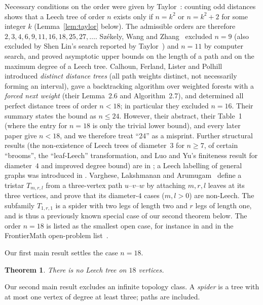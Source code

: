 \documentclass[11pt,a4paper]{article}
\theoremstyle{plain}
\newtheorem{theorem}{Theorem}[section]
\theoremstyle{remark}
\begin{document}
Necessary conditions on the order were given by Taylor~\cite{Taylor1977}:
counting odd distances shows that a Leech tree of order $n$ exists only if
$n=k^2$ or $n=k^2+2$ for some integer $k$ (Lemma~\ref{lem:taylor} below).  The
admissible orders are therefore $2,3,4,6,9,11,16,18,25,27,\dots$.  Sz\'ekely,
Wang and Zhang~\cite{SzekelyWangZhang2005} excluded $n=9$ (also excluded by Shen
Lin's search reported by Taylor~\cite{Taylor1991}) and $n=11$ by computer search,
and proved asymptotic upper bounds on the length of a path and on the maximum
degree of a Leech tree.  Calhoun, Ferland, Lister and Polhill~\cite{Calhoun2007}
introduced \emph{distinct distance trees} (all path weights distinct, not
necessarily forming an interval), gave a backtracking algorithm over weighted
forests with a \emph{forced next weight} (their Lemma~2.6 and Algorithm~2.7), and
determined all perfect distance trees of order $n<18$; in particular they
excluded $n=16$.  Their summary states the bound as $n\le 24$.  However, their
abstract, their Table~1 (where the entry for $n=18$ is only the trivial lower
bound), and every later paper give $n<18$, and we therefore treat ``24'' as a
misprint.
Further structural results (the non-existence of Leech trees of diameter~$3$
for $n\ge 7$, of certain ``brooms'', the ``leaf-Leech'' transformation, and Luo
and Yu's finiteness result for diameter~$4$ and improved degree bound) are in
\cite{OzenWangYalman2016,Varghese2020,LuoYu2024}; a Leech labelling of general
graphs was introduced in \cite{Eldho2024}.  Varghese, Lakshmanan and
Arumugam~\cite{VargheseTristar2023} define a tristar $T_{m,r,l}$ from a
three-vertex path $u$--$v$--$w$ by attaching $m,r,l$ leaves at its three
vertices, and prove that its diameter-$4$ cases ($m,l>0$) are non-Leech.  The
subfamily $T_{1,r,1}$ is a spider with two legs of length two and $r$ legs of
length one, and is thus a previously known special case of our second theorem
below.  The order $n=18$ is listed as the
smallest open case, for instance in \cite{Varghese2020,OzenWangYalman2016} and
in the FrontierMath open-problem list~\cite{FrontierMath}.

Our first main result settles the case $n=18$.

\begin{theorem}\label{thm:main}
There is no Leech tree on $18$ vertices.
\end{theorem}

Our second main result excludes an infinite topology class.  A \emph{spider}
is a tree with at most one vertex of degree at least three; paths are included.
\end{document}
